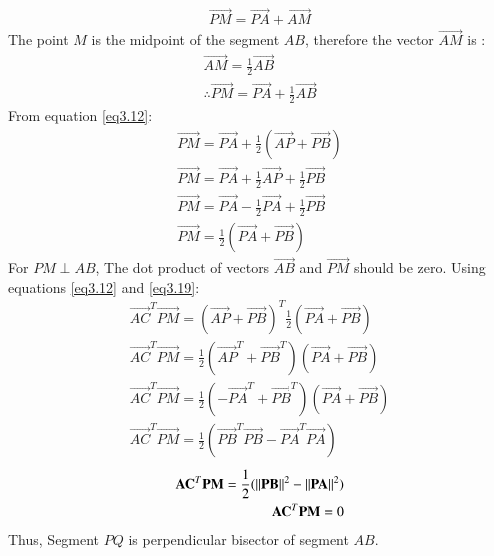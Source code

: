 \documentclass[journal,12pt,twocolumn]{IEEEtran}
\begin{document}
\begin{align}
\vec{PM}=\vec{PA}+\vec{AM}
\end{align}
The point $M$ is the midpoint of the segment $AB$, therefore the vector $\vec{AM}$ is :
\begin{align}
    \vec{AM}=\frac{1}{2}\Vec{AB}\\
    \therefore \vec{PM}=\vec{PA}+\frac{1}{2}\Vec{AB}
\end{align}
From equation \ref{eq3.12}:
\begin{align}
    \vec{PM}=\vec{PA}+\frac{1}{2}(\vec{AP}+\vec{PB})\\
     \vec{PM}=\vec{PA}+\frac{1}{2}\vec{AP}+\frac{1}{2}\vec{PB}\\
     \vec{PM}=\vec{PA}-\frac{1}{2}\vec{PA}+\frac{1}{2}\vec{PB}\\
     \vec{PM}=\frac{1}{2}(\vec{PA}+\vec{PB}) \label{eq3.19}
\end{align}
For $PM \perp AB $, The dot product of vectors $\Vec{AB}$ and $\Vec{PM}$ should be zero. Using equations \ref{eq3.12} and \ref{eq3.19}:
\begin{align}
    \vec{AC}^T\vec{PM}=(\vec{AP}+\vec{PB})^T\frac{1}{2}(\vec{PA}+\vec{PB})\\
     \vec{AC}^T\vec{PM}=\frac{1}{2}(\vec{AP}^T+\vec{PB}^T)(\vec{PA}+\vec{PB})\\
     \vec{AC}^T\vec{PM}=\frac{1}{2}(-\vec{PA}^T+\vec{PB}^T)(\vec{PA}+\vec{PB})\\
     \vec{AC}^T\vec{PM}=\frac{1}{2}(\vec{PB}^T\vec{PB}-\vec{PA}^T\vec{PA})
\end{align}
\begin{align}
     \mathbf{AC}^T\mathbf{PM}=\frac{1}{2}(\left\lVert\mathbf{PB}\right\rVert^2-\left\lVert\mathbf{PA}\right\rVert^2)\\
     \mathbf{AC}^T\mathbf{PM}=0
\end{align}
Thus, Segment $PQ$ is perpendicular bisector of segment $AB$.
\end{document}

